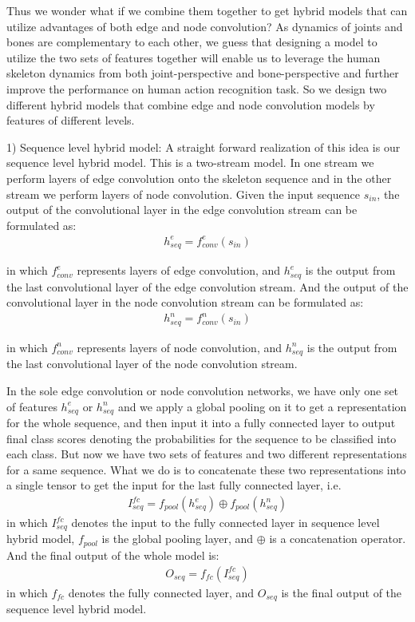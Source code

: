 \documentclass[a4paper,11pt]{article}
\begin{document}
Thus we wonder what if we combine them together to get hybrid models that can utilize advantages of both edge and node convolution? As dynamics of joints and bones are complementary to each other, we guess that designing a model to utilize the two sets of features together will enable us to leverage the human skeleton dynamics from both joint-perspective and bone-perspective and further improve the performance on human action recognition task.
So we design two different hybrid models that combine edge and node convolution models by features of different levels.


1) Sequence level hybrid model:
A straight forward realization of this idea is our sequence level hybrid model. This is a two-stream model. In one stream we perform layers of edge convolution onto the skeleton sequence and in the other stream we perform layers of node convolution. Given the input sequence $s_{in}$, the output of the convolutional layer in the edge convolution stream can be formulated as:
\begin{align}
& h_{seq}^e = f_{conv}^e (s_{in})&
\end{align}

in which $f_{conv}^e$ represents layers of edge convolution, and $h_{seq}^e$ is the output from the last convolutional layer of the edge convolution stream. And the output of the convolutional layer in the node convolution stream can be formulated as:
\begin{align}
& h_{seq}^n = f_{conv}^n (s_{in})&
\end{align}

in which $f_{conv}^n$ represents layers of node convolution, and $h_{seq}^n$ is the output from the last convolutional layer of the node convolution stream.

In the sole edge convolution or node convolution networks, we have only one set of features $h_{seq}^e$ or $h_{seq}^n$ and we apply a global pooling on it to get a representation for the whole sequence, and then input it into a fully connected layer
 to output final class scores denoting the probabilities for the sequence to be classified into each class. But now we have two sets of features and two different representations for a same sequence. What we do is to concatenate these two representations into a single tensor to get the input for the last fully connected layer, i.e.
\begin{align}
& I_{seq}^{fc} = f_{pool}(h_{seq}^e) \oplus f_{pool}(h_{seq}^n)&
\end{align}
in which $I_{seq}^{fc}$ denotes the input to the fully connected layer in sequence level hybrid model, $f_{pool}$ is the global pooling layer, and $\oplus$ is a concatenation operator.
And the final output of the whole model is:
\begin{align}
& O_{seq} = f_{fc}(I_{seq}^{fc})&
\end{align}
in which $f_{fc}$ denotes the fully connected layer, and $O_{seq}$ is the final output of the sequence level hybrid model.
\end{document}
